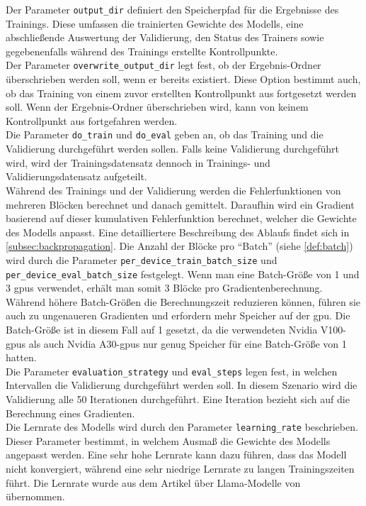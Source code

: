Der Parameter \texttt{output\_dir} definiert den Speicherpfad für die Ergebnisse des Trainings.
Diese umfassen die trainierten Gewichte des Modells, eine abschließende Auswertung der Validierung, den Status des Trainers sowie gegebenenfalls während des Trainings erstellte Kontrollpunkte.\\

Der Parameter \texttt{overwrite\_output\_dir} legt fest, ob der Ergebnis-Ordner überschrieben werden soll, wenn er bereits existiert.
Diese Option bestimmt auch, ob das Training von einem zuvor erstellten Kontrollpunkt aus fortgesetzt werden soll.
Wenn der Ergebnis-Ordner überschrieben wird, kann von keinem Kontrollpunkt aus fortgefahren werden.\\

Die Parameter \texttt{do\_train} und \texttt{do\_eval} geben an, ob das Training und die Validierung durchgeführt werden sollen.
Falls keine Validierung durchgeführt wird, wird der Trainingsdatensatz dennoch in Trainings- und Validierungsdatensatz aufgeteilt.\\

Während des Trainings und der Validierung werden die Fehlerfunktionen von mehreren Blöcken berechnet und danach gemittelt.
Daraufhin wird ein Gradient basierend auf dieser kumulativen Fehlerfunktion berechnet, welcher die Gewichte des Modells anpasst.
Eine detailliertere Beschreibung des Ablaufs findet sich in \cref{subsec:backpropagation}.
Die Anzahl der Blöcke pro \enquote{Batch} (siehe \cref{def:batch}) wird durch die Parameter \texttt{per\_device\_train\_batch\_size} und \texttt{per\_device\_eval\_\allowbreak{}batch\_size} festgelegt.
Wenn man eine Batch-Größe von 1 und 3 \ac{gpu}s verwendet, erhält man somit 3 Blöcke pro Gradientenberechnung.
Während höhere Batch-Größen die Berechnungszeit reduzieren können, führen sie auch zu ungenaueren Gradienten und erfordern mehr Speicher auf der \ac{gpu}.
Die Batch-Größe ist in diesem Fall auf 1 gesetzt, da die verwendeten Nvidia V100-\ac{gpu}s als auch Nvidia A30-\ac{gpu}s nur genug Speicher für eine Batch-Größe von 1 hatten.\\

Die Parameter \texttt{evaluation\_strategy} und \texttt{eval\_steps} legen fest, in welchen Intervallen die Validierung durchgeführt werden soll.
In diesem Szenario wird die Validierung alle 50 Iterationen durchgeführt.
Eine Iteration bezieht sich auf die Berechnung eines Gradienten.\\

Die Lernrate des Modells wird durch den Parameter \texttt{learning\_rate} beschrieben.
Dieser Parameter bestimmt, in welchem Ausmaß die Gewichte des Modells angepasst werden.
Eine sehr hohe Lernrate kann dazu führen, dass das Modell nicht konvergiert, während eine sehr niedrige Lernrate zu langen Trainingszeiten führt.
Die Lernrate wurde aus dem Artikel über Llama-Modelle von \citet{llama} übernommen.\\

